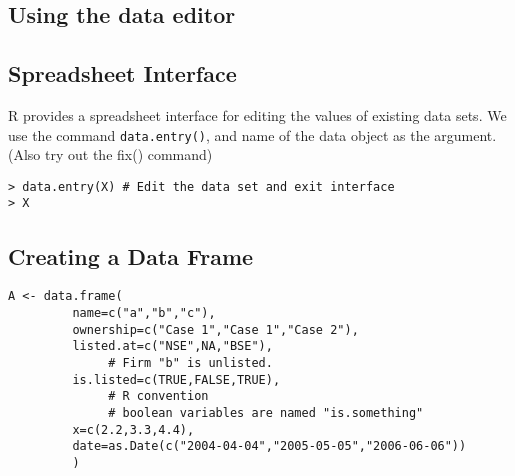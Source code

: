 \documentclass[a4paper,12pt]{article}
\begin{document}
\subsection*{Using the data editor}
\subsection*{Spreadsheet Interface}
R provides a spreadsheet interface for editing the values of existing data sets. We use the
command \texttt{data.entry()}, and name of the data object as the argument. (Also try out the
fix() command)
\begin{framed}
\begin{verbatim}
> data.entry(X) # Edit the data set and exit interface
> X

\end{verbatim}
\end{framed}



\subsection*{Creating a Data Frame}
\begin{framed}
\begin{verbatim}
A <- data.frame(
         name=c("a","b","c"),
         ownership=c("Case 1","Case 1","Case 2"),
         listed.at=c("NSE",NA,"BSE"),
              # Firm "b" is unlisted.
         is.listed=c(TRUE,FALSE,TRUE),
              # R convention
              # boolean variables are named "is.something"
         x=c(2.2,3.3,4.4),
         date=as.Date(c("2004-04-04","2005-05-05","2006-06-06"))
         )
\end{verbatim}
\end{framed}
\end{document}
